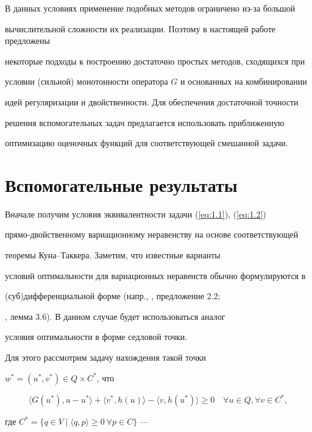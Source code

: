 В данных условиях применение подобных методов ограничено из-за большой 


вычислительной сложности их реализации. Поэтому в настоящей работе предложены 


некоторые подходы к построению достаточно простых методов, сходящихся при 


условии (сильной) монотонности оператора $G$ и основанных на комбинировании 


идей регуляризации и двойственности. Для обеспечения достаточной точности 


решения вспомогательных задач предлагается использовать приближенную 


оптимизацию оценочных функций для соответствующей смешанной задачи.





\section{Вспомогательные результаты}





Вначале получим условия эквивалентности задачи (\ref{eq:1.1}), (\ref{eq:1.2})


прямо-двойственному вариационному неравенству на основе соответствующей 


теоремы Куна--Таккера. Заметим, что известные варианты


условий оптимальности для вариационных неравенств обычно формулируются в


(суб)дифференциальной форме (напр., \cite{HP90}, предложение 2.2;


\cite{BG89}, лемма 3.6). В данном случае будет использоваться аналог


условия оптимальности в форме седловой точки.


Для этого рассмотрим задачу нахождения такой точки


$w^*=(u^*, v^*) \in Q \times C^*$, что


\begin{equation} \label{eq:2.1} 


\langle G(u^*), u - u^* \rangle+\langle v^*, h(u) \rangle - 


\langle v, h(u^*)\rangle \geq 0 \quad \forall u \in Q, \forall v \in C^*,


\end{equation}


где $C^*=\{q\in V\mid\langle q,p\rangle \geq 0 \ \forall p \in C \}$ ---


